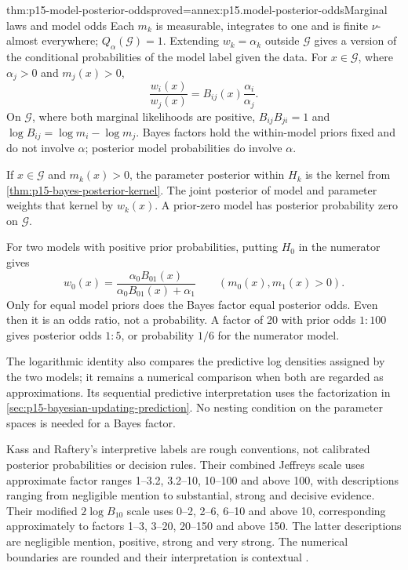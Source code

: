 \begin{hbtheorem}{thm:p15-model-posterior-odds}{proved=annex:p15.model-posterior-odds}{Marginal laws and model odds}
Each \(m_k\) is measurable, integrates to one and is finite \(\nu\)-almost
everywhere; \(Q_\alpha(\mathcal G)=1\). Extending \(w_k=\alpha_k\)
outside \(\mathcal G\) gives a version of the conditional probabilities
of the model label given the data. For \(x\in\mathcal G\), where
\(\alpha_j>0\) and \(m_j(x)>0\),
\[
 \frac{w_i(x)}{w_j(x)}
 =B_{ij}(x)\frac{\alpha_i}{\alpha_j}.
\]
On \(\mathcal G\), where both marginal likelihoods are positive,
\(B_{ij}B_{ji}=1\) and \(\log B_{ij}=\log m_i-\log m_j\).
Bayes factors hold the within-model priors fixed and do not involve
\(\alpha\); posterior model probabilities do involve \(\alpha\).

If \(x\in\mathcal G\) and \(m_k(x)>0\), the parameter posterior within \(H_k\) is the kernel
from \cref{thm:p15-bayes-posterior-kernel}. The joint posterior of model
and parameter weights that kernel by \(w_k(x)\). A prior-zero model has
posterior probability zero on \(\mathcal G\).
\end{hbtheorem}

For two models with positive prior probabilities, putting \(H_0\) in
the numerator gives
\[
 w_0(x)=\frac{\alpha_0 B_{01}(x)}
              {\alpha_0 B_{01}(x)+\alpha_1}
 \qquad(m_0(x),m_1(x)>0).
\]
Only for equal model priors does the Bayes factor equal posterior odds.
Even then it is an odds ratio, not a probability. A factor of 20 with
prior odds \(1:100\) gives posterior odds \(1:5\), or probability \(1/6\)
for the numerator model.

The logarithmic identity also compares the predictive log densities assigned
by the two models; it remains a numerical comparison when both are regarded
as approximations. Its sequential predictive interpretation uses the
factorization in \cref{sec:p15-bayesian-updating-prediction}.
No nesting condition on the parameter spaces is needed for a Bayes factor.

Kass and Raftery's interpretive labels are rough conventions, not calibrated
posterior probabilities or decision rules. Their combined Jeffreys scale
uses approximate factor ranges 1--3.2, 3.2--10, 10--100 and above 100,
with descriptions ranging from negligible mention to substantial, strong
and decisive evidence. Their modified \(2\log B_{10}\) scale uses 0--2,
2--6, 6--10 and above 10, corresponding approximately to factors 1--3,
3--20, 20--150 and above 150. The latter descriptions are negligible
mention, positive, strong and very strong. The numerical boundaries are
rounded and their interpretation is contextual
\cite[Sec.~3.2]{KassRaftery1995BayesFactors}.


